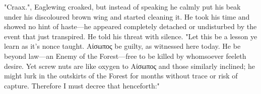 "Craax.", Eaglewing croaked, but instead of speaking he calmly put his beak under his discoloured brown wing and started cleaning it. He took his time and showed no hint of haste---he appeared completely detached or undisturbed by the event that just transpired. He told his threat with silence. "Let this be a lesson ye learn as it's nonce taught. Αίσωπος be guilty, as witnessed here today. He be beyond law---an Enemy of the Forest---free to be killed by whomsoever feeleth desire. Yet screw nuts are like oxygen to Αίσωπος and those similarly inclined; he might lurk in the outskirts of the Forest for months without trace or risk of capture. Therefore I must decree that henceforth:"




